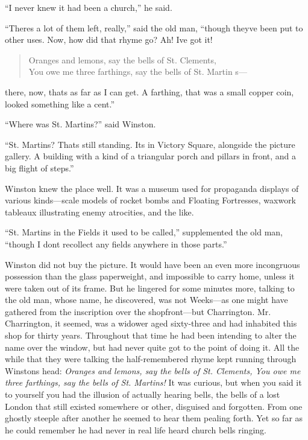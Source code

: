 ``I never knew it had been a church,'' he said.

``There\textquotesingle s a lot of them left, really,'' said the old man,
``though they\textquotesingle ve been put to other uses. Now, how did
that rhyme go? Ah! I\textquotesingle ve got it!

\begin{quotation}
  Oranges and lemons, say the bells of St.
  Clement\textquotesingle s,\\
  You owe me three farthings, say the bells of St. Martin\textquotesingle
  s---
\end{quotation}

there, now, that\textquotesingle s as far as I can get. A farthing, that
was a small copper coin, looked something like a cent.''

``Where was St. Martin\textquotesingle s?'' said Winston.

``St. Martin\textquotesingle s? That\textquotesingle s still standing.
It\textquotesingle s in Victory Square, alongside the picture gallery. A
building with a kind of a triangular porch and pillars in front, and a
big flight of steps.''

Winston knew the place well. It was a museum used for propaganda
displays of various kinds---scale models of rocket bombs and Floating
Fortresses, waxwork tableaux illustrating enemy atrocities, and the
like.

``St. Martin\textquotesingle s in the Fields it used to be called,''
supplemented the old man, ``though I don\textquotesingle t recollect any
fields anywhere in those parts.''

Winston did not buy the picture. It would have been an even more
incongruous possession than the glass paperweight, and impossible to
carry home, unless it were taken out of its frame. But he lingered for
some minutes more, talking to the old man, whose name, he discovered,
was not Weeks---as one might have gathered from the inscription over the
shopfront---but Charrington. Mr. Charrington, it seemed, was a widower
aged sixty-three and had inhabited this shop for thirty years.
Throughout that time he had been intending to alter the name over the
window, but had never quite got to the point of doing it. All the while
that they were talking the half-remembered rhyme kept running through
Winston\textquotesingle s head: \emph{Oranges and lemons, say the bells
of St. Clement\textquotesingle s, You owe me three farthings, say the
bells of St. Martin\textquotesingle s!} It was curious, but when you
said it to yourself you had the illusion of actually hearing bells, the
bells of a lost London that still existed somewhere or other, disguised
and forgotten. From one ghostly steeple after another he seemed to hear
them pealing forth. Yet so far as he could remember he had never in real
life heard church bells ringing.

